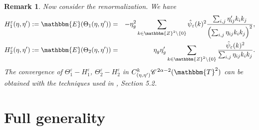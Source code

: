 \documentclass[11pt,reqno]{amsart}
\newcommand{\assign}{:=}
\newtheorem{remark}[theorem]{Remark}
\newcommand{\CC}{\mathscr{C} \hspace{.1em}}
\begin{document}
\begin{remark}
  Now consider the renormalization. We have
  \begin{eqnarray*}
    H_1^{\varepsilon} (\eta, \eta') \assign \mathbbm{E} (\Theta_1 (\eta,
    \eta')) & = & - \eta_g^2 \sum_{k \in \mathbbm{Z}^2 \backslash \{ 0 \}}
    \hat{\psi}_{\varepsilon} (k)^2 \frac{\sum_{i, j} \eta'_{i j} k_i
    k_j}{\left( \sum_{i, j} \eta_{i j} k_i k_j \right)^2},\\
    H_2^{\varepsilon} (\eta, \eta') \assign \mathbbm{E} (\Theta_2 (\eta,
    \eta')) & = & \eta_g \eta'_g \sum_{k \in \mathbbm{Z}^2 \backslash \{ 0 \}}
    \frac{\hat{\psi}_{\varepsilon} (k)^2}{\sum_{i, j} \eta_{i j} k_i k_j} .
  \end{eqnarray*}
  The convergence of $\Theta_1^{\varepsilon} - H_1^{\varepsilon}$,
  $\Theta_2^{\varepsilon} - H_2^{\varepsilon}$ in $C_{(\eta, \eta')}^k \CC^{2
  \alpha - 2} (\mathbbm{T}^2)$ can be obtained with the techniques used in
  {\cite{gubinelli_paracontrolled_2015}}, Section 5.2. 
\end{remark}

\section{Full generality}
\end{document}
